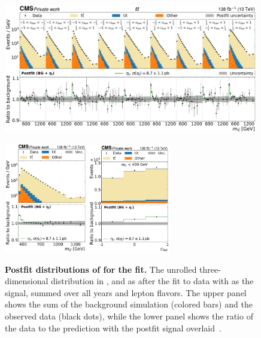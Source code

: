\begin{figure}[p]
    \centering
    \includegraphics[width=0.99\textwidth]{figures/ah/prepost/EtaT_fit_s_ll_run2_both.pdf}
    \caption{
        \label{fig:ah:postfit_etat_ll}
        \textbf{Postfit distributions of \mttchelchan for the \etat fit.} The unrolled three-dimensional distribution in \mtt, \chel and \chan as after the fit to data with \etat as the signal, summed over all years and lepton flavors. The upper panel shows the sum of the background simulation (colored bars) and the observed data (black dots), while the lower panel shows the ratio of the data to the prediction with the postfit \etat signal overlaid~\cite{CMS:TOP-24-007}.
    }
    \vspace{1cm}  
    \includegraphics[width=0.32\textwidth]{figures/ah/prepost/EtaT_fit_s_ll_run2_both_mtt.pdf}
    \hfill
    \includegraphics[width=0.32\textwidth]{figures/ah/prepost/EtaT_fit_s_ll_run2_both_chel_mttlt400.pdf}

\end{figure}
